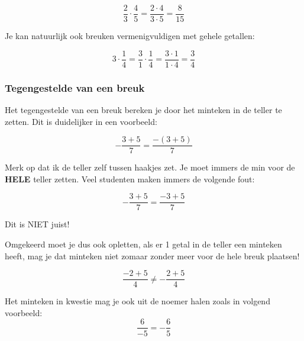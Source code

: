 \begin{equation*}
\frac{2}{3}\cdot \frac{4}{5} = \frac{2 \cdot 4}{3 \cdot 5} = \frac{8}{15}
\end{equation*}

Je kan natuurlijk ook breuken vermenigvuldigen met gehele getallen:

\begin{equation*}
3\cdot \frac{1}{4} = \frac{3}{1} \cdot \frac{1}{4} = \frac{3 \cdot 1}{1 \cdot 4} = \frac{3}{4}
\end{equation*}


\subsubsection{Tegengestelde van een breuk}

Het tegengestelde van een breuk bereken je door het minteken in de teller te zetten. Dit is duidelijker in een voorbeeld:

\begin{equation*}
-\frac{3+5}{7}=\frac{-(3+5)}{7}
\end{equation*}

Merk op dat ik de teller zelf tussen haakjes zet. Je moet immers de min voor de \textbf{HELE} teller zetten. Veel studenten maken immers de volgende fout:

\begin{equation*}
-\frac{3+5}{7}=\frac{-3+5}{7}
\end{equation*}

Dit is NIET juist!



Omgekeerd moet je dus ook opletten, als er 1 getal in de teller een minteken heeft, mag je dat minteken niet zomaar zonder meer voor de hele breuk plaatsen!

\begin{equation*}
\frac{-2+5}{4} \ne -\frac{2+5}{4}
\end{equation*}

Het minteken in kwestie mag je ook uit de noemer halen zoals in volgend voorbeeld:
\begin{equation*}
\frac{6}{-5}=-\frac{6}{5}
\end{equation*}


